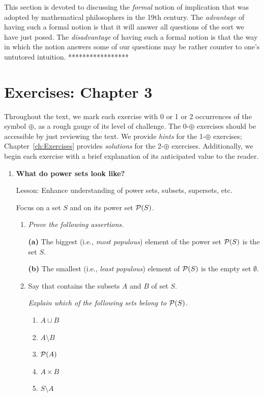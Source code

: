 {{This section is devoted to discussing the {\em formal} notion of implication that was adopted by mathematical philosophers in the 19th century.  The {\em advantage} of having such a formal notion is that it will answer all questions of the sort we have just posed.  The {\em disadvantage} of having such a formal notion is that the way in which the notion answers some of our questions may be rather counter to one's untutored intuition.
*****************}



\section{Exercises: Chapter 3}

Throughout the text, we mark each exercise with 0 or 1 or 2
occurrences of the symbol $\oplus$, as a rough gauge of its level of
challenge.  The 0-$\oplus$ exercises should be accessible by just
reviewing the text.  We provide {\em hints} for the 1-$\oplus$
exercises; Chapter~\ref{ch:Exercises} provides {\em solutions} for the
2-$\oplus$ exercises.  Additionally, we begin each exercise with a
brief explanation of its anticipated value to the reader.
 

\begin{enumerate}
\item
{\bf What do power sets look like?}

{\sc Lesson:} Enhance understanding of power sets, subsets, supersets, etc.

\smallskip

Focus on a set $S$ and on its power set $\mbox{$\cal P$}(S)$.
  \begin{enumerate}
  \item
{\em Prove the following assertions.}

\begin{prop}
{\bf (a)}
The biggest (i.e., {\em most populous}) element of the power set $\mbox{$\cal P$}(S)$ is the set $S$.

{\bf (b)}
The smallest (i.e., {\em least populous}) element of $\mbox{$\cal P$}(S)$ is the empty set $\emptyset$.
\end{prop}

  \medskip\item
Say that contains the subsets $A$ and $B$ of set $S$.

{\em Explain which of the following sets belong to $\mbox{$\cal P$}(S)$.}
\begin{enumerate}
\item
$A \cup B$
\medskip\item
$A \setminus B$
\medskip\item
$\mbox{$\cal P$}(A)$
\medskip\item
$A \times B$
\medskip\item
$S \setminus A$
\end{enumerate}
  \end{enumerate}



\end{enumerate}}
